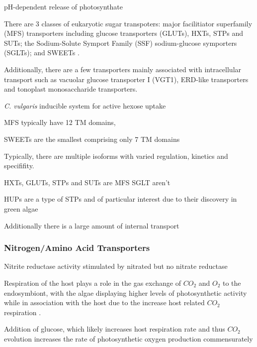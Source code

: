  pH-dependent release of photosynthate \citep{}



There are 3 classes of eukaryotic sugar transpoters: major facilitiator superfamily (MFS) 
transporters including glucose
transporters (GLUTs), HXTs, STPs and SUTs; the Sodium-Solute Symport Family (SSF) sodium-glucose symporters (SGLTs); 
and SWEETs \citep{Chen2010a,Chen2015}.

Additionally, there are a few transporters mainly associated with intracellular transport such as 
vacuolar glucose transporter I (VGT1), ERD-like transporters and tonoplast monosaccharide transporters.


\textit{C. vulgaris} inducible system for active hexose uptake \citep{Tanner1974}






MFS typically have 12 TM domains, 

SWEETs are the smallest comprising only 7 TM domains \citep{Chen2015}

Typically, there are multiple isoforms with varied regulation, kinetics and specififity.




HXTs, GLUTs, STPs and SUTs are MFS
SGLT aren't



HUPs are a type of STPs \citep{Chen2015} and of particular interest due to their discovery in green
algae \citep{Sauer1989}




Additionally there is a large amount of internal transport 





\subsubsection{Nitrogen/Amino Acid Transporters}

Nitrite reductase activity stimulated by nitrated but no nitrate reductase
\citep{Kamako2005}




 Respiration of the host plays a role in the gas exchange of \(CO_2\) and \(O_2\) 
 to the endosymbiont, with the algae displaying higher levels of photosynthetic
 activity while in association with the host due to the increase host related 
 \(CO_2\) respiration \citep{Reisser1980}.

Addition of glucose, which likely increases host respiration rate and thus \(CO_2\)
evolution increases the rate of photosynthetic oxygen production commensurately \citep{Reisser1980}




